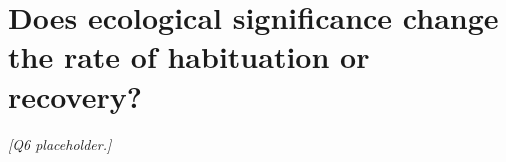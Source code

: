 \section{Does ecological significance change the rate of habituation or recovery?}
\label{sec:q6}


\textit{[Q6 placeholder.]}
